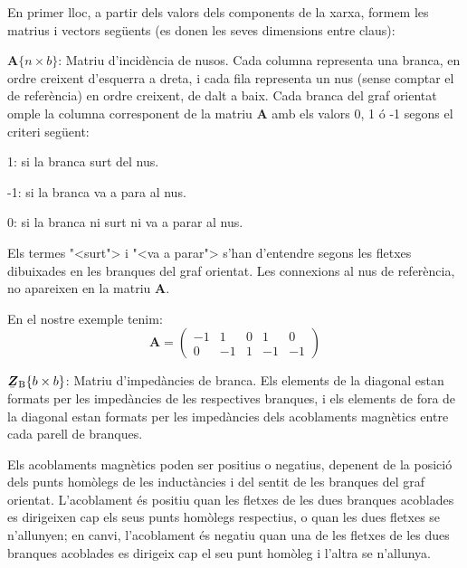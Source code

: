 En primer lloc, a partir dels valors dels components de la xarxa, formem les matrius i vectors seg\"{u}ents (es donen les seves dimensions entre claus):
\begin{list}{}
{\setlength{\labelwidth}{20mm} \setlength{\leftmargin}{22mm} \setlength{\labelsep}{2mm}}
   \item[$\boldsymbol{A}\{n\times b\}$:] Matriu d'incid\`{e}ncia de nusos. Cada columna representa una branca, en ordre creixent d'esquerra a dreta, i cada fila representa un nus (sense comptar el de refer\`{e}ncia) en ordre creixent, de dalt a baix. Cada branca del graf orientat omple la columna corresponent de la matriu $\boldsymbol{A}$ amb els valors 0, 1 \'{o} -1 segons el criteri seg\"{u}ent:
   \begin{list}{}
   {\setlength{\labelwidth}{7mm} \setlength{\leftmargin}{9mm} \setlength{\labelsep}{2mm}}
      \item[1:]  si la branca surt del nus.
      \item[-1:] si la branca va a para al nus.
      \item[0:]  si la branca ni surt ni va a parar al nus.
   \end{list}
   Els termes {"<}surt{">} i {"<}va a parar{">} s'han d'entendre segons les fletxes dibuixades en les branques del graf orientat. Les connexions al nus de refer\`{e}ncia, no apareixen en la matriu $\boldsymbol{A}$.

   En el nostre exemple tenim:
   \[
      \boldsymbol{A} = \left(\begin{array}{rrrrr} -1 & 1  & 0 &  1 & 0 \\  0 & -1 & 1 & -1 & -1
                   \end{array} \right)
   \]

   \item[$\mcmplx{Z}\ped{B}\{b\times b\}$:] Matriu d'imped\`{a}ncies de branca. Els elements de la diagonal estan formats per les imped\`{a}ncies de les respectives branques, i els elements de fora de la diagonal estan formats per les imped\`{a}ncies dels acoblaments magn\`{e}tics entre cada parell de branques.

   Els acoblaments magn\`{e}tics poden ser positius o negatius, depenent
    de la posici\'{o} dels punts hom\`{o}legs de les induct\`{a}ncies i del sentit
    de les branques del graf orientat. L'acoblament \'{e}s positiu quan les
    fletxes de les dues branques acoblades es dirigeixen cap els seus punts
    hom\`{o}legs respectius, o quan les dues fletxes se n'allunyen; en canvi,
    l'acoblament \'{e}s negatiu quan una de les fletxes de les dues branques
    acoblades es dirigeix cap el seu punt hom\`{o}leg i l'altra se n'allunya.


\end{list}

